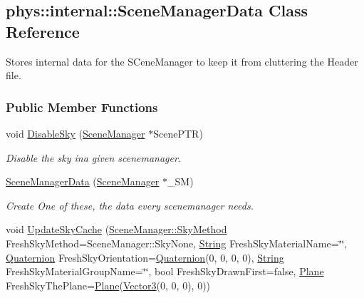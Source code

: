 \hypertarget{classphys_1_1internal_1_1SceneManagerData}{
\subsection{phys::internal::SceneManagerData Class Reference}
\label{classphys_1_1internal_1_1SceneManagerData}
}


Stores internal data for the SCeneManager to keep it from cluttering the Header file.  


\subsubsection*{Public Member Functions}
\begin{DoxyCompactItemize}
\item 
void \hyperlink{classphys_1_1internal_1_1SceneManagerData_a40d62405f637531b7fd19b6c176c5a50}{DisableSky} (\hyperlink{classphys_1_1SceneManager}{SceneManager} $\ast$ScenePTR)
\begin{DoxyCompactList}\small\item\em Disable the sky ina given scenemanager. \item\end{DoxyCompactList}\item 
\hyperlink{classphys_1_1internal_1_1SceneManagerData_aedd570da5bdb027ec976e3c29137474c}{SceneManagerData} (\hyperlink{classphys_1_1SceneManager}{SceneManager} $\ast$\_\-SM)
\begin{DoxyCompactList}\small\item\em Create One of these, the data every scenemanager needs. \item\end{DoxyCompactList}\item 
\hypertarget{classphys_1_1internal_1_1SceneManagerData_a0e4db14de622e028e5bea383d37099ed}{
void \hyperlink{classphys_1_1internal_1_1SceneManagerData_a0e4db14de622e028e5bea383d37099ed}{UpdateSkyCache} (\hyperlink{classphys_1_1SceneManager_a91dd086aabaab926d070c65fc14828d6}{SceneManager::SkyMethod} FreshSkyMethod=SceneManager::SkyNone, \hyperlink{namespacephys_aa03900411993de7fbfec4789bc1d392e}{String} FreshSkyMaterialName=\char`\"{}\char`\"{}, \hyperlink{classphys_1_1Quaternion}{Quaternion} FreshSkyOrientation=\hyperlink{classphys_1_1Quaternion}{Quaternion}(0, 0, 0, 0), \hyperlink{namespacephys_aa03900411993de7fbfec4789bc1d392e}{String} FreshSkyMaterialGroupName=\char`\"{}\char`\"{}, bool FreshSkyDrawnFirst=false, \hyperlink{classphys_1_1Plane}{Plane} FreshSkyThePlane=\hyperlink{classphys_1_1Plane}{Plane}(\hyperlink{classphys_1_1Vector3}{Vector3}(0, 0, 0), 0))}
\label{classphys_1_1internal_1_1SceneManagerData_a0e4db14de622e028e5bea383d37099ed}


\end{DoxyCompactItemize}
